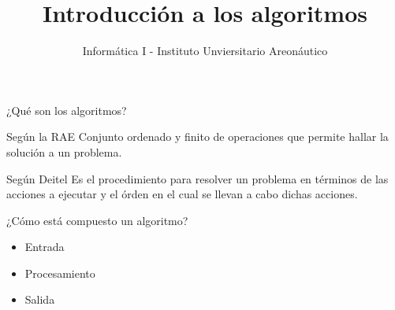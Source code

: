 \documentclass[xcolor=pdftex,table,11pt]{beamer}
\author{Informática I - Instituto Unviersitario Areonáutico}
\title{Introducción a los algoritmos}
\begin{document}
\begin{frame}
\titlepage
\end{frame}

\begin{frame}
\tableofcontents
\end{frame}

\begin{frame}{¿Qué son los algoritmos?}
\begin{block}{Según la RAE}
         Conjunto ordenado y finito de operaciones que permite hallar la solución a un problema.
    \end{block}
 
 \begin{block}{Según Deitel}
         Es el procedimiento para resolver un problema en términos de las acciones a ejecutar y el órden en el cual se llevan a cabo dichas acciones.
    \end{block}
    
\begin{block}{¿Cómo está compuesto un algoritmo?}
   \begin{itemize}
   \item Entrada
   \item Procesamiento
   \item Salida
   \end{itemize}
\end{block}


\end{frame}
\end{document}
